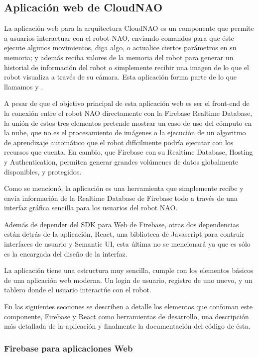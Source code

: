 
\subsection{Aplicación web de CloudNAO}
\label{\detokenize{nao_web:introduccion}}
La aplicación web para la arquitectura CloudNAO es un componente que permite a
usuarios interactuar con el robot NAO, enviando comandos para que éste ejecute
algunos movimientos, diga algo, o actualice ciertos parámetros en su memoria;
y además reciba valores de la memoria del robot para generar un historial
de información del robot o simplemente recibir una imagen de lo que el robot
visualiza a través de su cámara. Esta aplicación forma parte de lo que
llamamos  y .

A pesar de que el objetivo principal de esta aplicación web es ser el
front-end de la conexión entre el robot NAO directamente con la Firebase
Realtime Database, la unión de estos tres elementos pretende
mostrar un caso de uso del cómputo en la nube, que no es el procesamiento de
imágenes o la ejecución de un algoritmo de aprendizaje automático que el robot
difícilmente podría ejecutar con los recursos que cuenta. En cambio,
que Firebase con su Realtime Database, Hosting y Authentication, permiten
generar grandes volúmenes de datos globalmente disponibles, y protegidos.

Como se mencionó, la aplicación es una herramienta que simplemente recibe y envía información de la Realtime Database de
Firebase todo a través de una interfaz gráfica sencilla para los usuarios
del robot NAO.

Además de depender del SDK para Web de Firebase, otras dos dependencias están
detrás de la aplicación, React, una biblioteca de Javascript para contruir
interfaces de usuario y Semantic UI, esta última no se mencionará ya que
es sólo es la encargada del diseño de la interfaz.

La aplicación tiene una estructura muy sencilla, cumple con los elementos
básicos de una aplicación web moderna. Un login de usuario, registro de uno
nuevo, y un tablero donde el usuario interactúe con el robot.

En las siguientes secciones se describen a detalle los elementos que confoman
este componente, Firebase y React como herramientas de desarrollo,
una descripción más detallada de la aplicación y finalmente la documentación
del código de ésta.


\subsubsection{Firebase para aplicaciones Web}
\label{\detokenize{firebase_web:firebase-para-aplicaciones-web}}\label{\detokenize{firebase_web::doc}}

